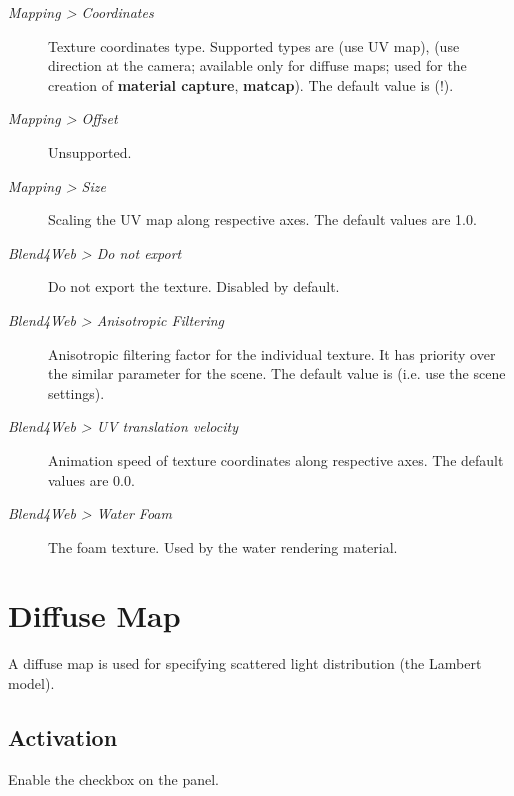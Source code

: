 \documentclass[a4paper,12pt,oneside]{sphinxmanual}
\begin{document}
\begin{description}
\item[{\emph{Mapping \textgreater{} Coordinates}}] \leavevmode
Texture coordinates type. Supported types are  (use UV map),  (use direction at the camera; available only for diffuse maps; used for the creation of \textbf{material capture}, \textbf{matcap}). The default value is  (!).

\item[{\emph{Mapping \textgreater{} Offset}}] \leavevmode
Unsupported.

\item[{\emph{Mapping \textgreater{} Size}}] \leavevmode
Scaling the UV map along respective axes. The default values are 1.0.

\item[{\emph{Blend4Web \textgreater{} Do not export}}] \leavevmode
Do not export the texture. Disabled by default.

\item[{\emph{Blend4Web \textgreater{} Anisotropic Filtering}}] \leavevmode
Anisotropic filtering factor for the individual texture. It has priority over the similar parameter for the scene. The default value is  (i.e. use the scene settings).

\item[{\emph{Blend4Web \textgreater{} UV translation velocity}}] \leavevmode
Animation speed of texture coordinates along respective axes. The default values are 0.0.

\item[{\emph{Blend4Web \textgreater{} Water Foam}}] \leavevmode
The foam texture. Used by the water rendering material.

\end{description}


\section{Diffuse Map}
\label{textures:index-4}\label{textures:diffuse-map}
A diffuse map is used for specifying scattered light distribution (the Lambert model).


\subsection{Activation}
\label{textures:id4}
Enable the  checkbox on the  panel.
\end{document}
